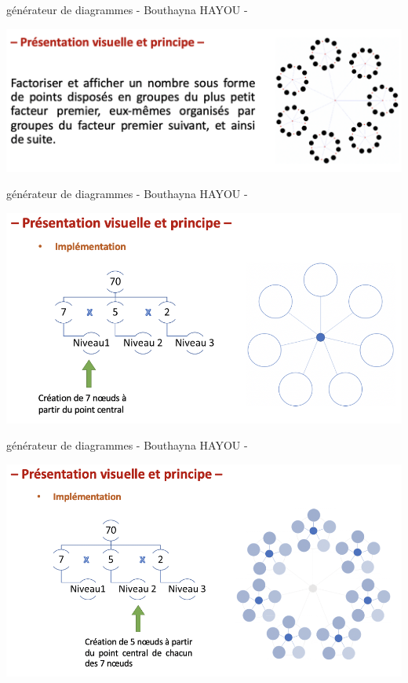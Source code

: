 \documentclass[aspectratio=169]{beamer}
\begin{document}
\begin{frame}[fragile=singleslide]{générateur de diagrammes \qquad \qquad \qquad - Bouthayna HAYOU -}
\begin{center}
    \includegraphics[width=14 cm]{./res/presprincipe.png}
\end{center}
\end{frame}

\begin{frame}[fragile=singleslide]{générateur de diagrammes \qquad \qquad \qquad - Bouthayna HAYOU -}
\begin{center}
    \includegraphics[width=13 cm]{./res/impl1.png}
\end{center}
\end{frame}

\begin{frame}[fragile=singleslide]{générateur de diagrammes \qquad \qquad \qquad - Bouthayna HAYOU -}
\begin{center}
    \includegraphics[width=13.5 cm]{./res/impl2.png}
\end{center}
\end{frame}
\end{document}
